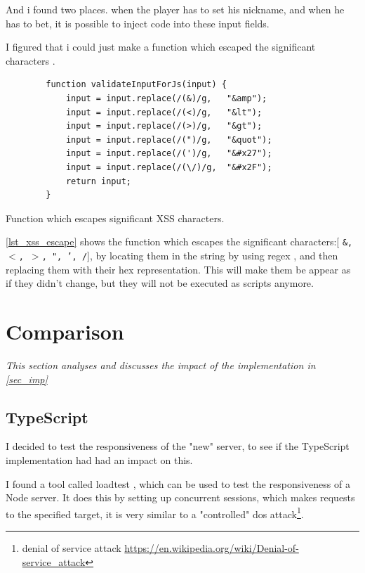 \documentclass[a4paper]{article}
\begin{document}
And i found two places. when the player has to set his nickname, and when he has to bet, it is possible to inject code into these input fields.

I figured that i could just make a function which escaped the significant characters \cite{xss-prep}.

\begin{listing}[H]
\begin{verbatim}
        function validateInputForJs(input) {
            input = input.replace(/(&)/g,   "&amp");
            input = input.replace(/(<)/g,   "&lt");
            input = input.replace(/(>)/g,   "&gt");
            input = input.replace(/(")/g,   "&quot");
            input = input.replace(/(')/g,   "&#x27");
            input = input.replace(/(\/)/g,  "&#x2F");
            return input;
        }
\end{verbatim}
\caption{Function which escapes significant XSS characters.}
\label{lst_xss_escape}
\end{listing}

\autoref{lst_xss_escape} shows the function which escapes the significant characters:[ \texttt{\&, $<$, $>$, ", ', /}], by locating them in the string by using regex \cite{regex}, and then replacing them with their hex representation. This will make them be appear as if they didn't change, but they will not be executed as scripts anymore.




\section{Comparison}
\textit{This section analyses and discusses the impact of the implementation in \autoref{sec_imp}}


\subsection{TypeScript}

I decided to test the responsiveness of the "new" server, to see if the TypeScript implementation had had an impact on this.

I found a tool called loadtest \cite{loadtest}, which can be used to test the responsiveness of a Node server. It does this by setting up concurrent sessions, which makes requests to the specified target, it is very similar to a "controlled" dos attack\footnote{ denial of service attack \url{https://en.wikipedia.org/wiki/Denial-of-service_attack}}.
\end{document}
